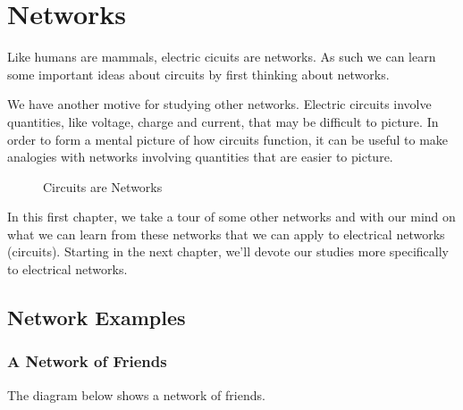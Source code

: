 \chapter{Networks}

Like humans are mammals, electric cicuits are networks. As such we can learn some important ideas about circuits by first thinking about networks. \par

We have another motive for studying other networks. Electric circuits involve quantities, like voltage, charge and current, that may be difficult to picture. In order to form a mental picture of how circuits function, it can be useful to make analogies with networks involving quantities that are easier to picture.\par

\begin{figure}[H]
\begin{center}
\caption{Circuits are Networks}
\label{F:1FCAREN}
\end{center}
\end{figure}

In this first chapter, we take a tour of some other networks and with our mind on what we can learn from these networks that we can apply to electrical networks (circuits). Starting in the next chapter, we'll devote our studies more specifically to electrical networks.\par


 

\section{Network Examples}

\subsection{A Network of Friends}
The diagram below shows a network of friends.

